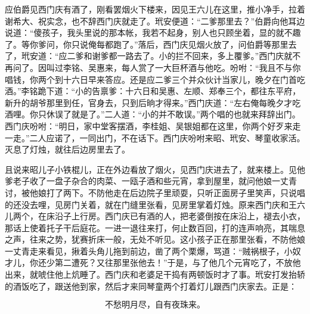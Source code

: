 应伯爵见西门庆有酒了，刚看罢烟火下楼来，因见王六儿在这里，推小净手，拉着谢希大、祝实念，也不辞西门庆就走了。玳安便道：“二爹那里去？”伯爵向他耳边说道：“傻孩子，我头里说的那本帐，我若不起身，别人也只顾坐着，显的就不趣了。等你爹问，你只说俺每都跑了。”落后，西门庆见烟火放了，问伯爵等那里去了，玳安道：“应二爹和谢爹都一路去了。小的拦不回来，多上覆爹。”西门庆就不再问了。因叫过李铭、吴惠来，每人赏了一大巨杯酒与他吃。吩咐：“我且不与你唱钱，你两个到十六日早来答应。还是应二爹三个并众伙计当家儿，晚夕在门首吃酒。”李铭跪下道：“小的告禀爹：十六日和吴惠、左顺、郑奉三个，都往东平府，新升的胡爷那里到任，官身去，只到后晌才得来。”西门庆道：“左右俺每晚夕才吃酒哩。你只休误了就是了。”二人道：“小的并不敢误。”两个唱的也就来拜辞出门。西门庆吩咐：“明日，家中堂客摆酒，李桂姐、吴银姐都在这里，你两个好歹来走一走。”二人应诺了，一同出门，不在话下。西门庆吩咐来昭、玳安、琴童收家活。灭息了灯烛，就往后边房里去了。

且说来昭儿子小铁棍儿，正在外边看放了烟火，见西门庆进去了，就来楼上。见他爹老子收了一盘子杂合的肉菜、一瓯子酒和些元宵，拿到屋里，就问他娘一丈青讨，被他娘打了两下。不防他走在后边院子里顽耍，只听正面房子里笑声，只说唱的还没去哩，见房门关着，就在门缝里张看，见房里掌着灯烛。原来西门庆和王六儿两个，在床沿子上行房。西门庆已有酒的人，把老婆倒按在床沿上，褪去小衣，那话上使着托子干后庭花。一进一退往来打，何止数百回，打的连声响亮，其喘息之声，往来之势，犹赛折床一般，无处不听见。这小孩子正在那里张看，不防他娘一丈青走来看见，揪着头角儿拖到前边，凿了两个栗爆，骂道：“贼祸根子，小奴才儿，你还少第二遭死？又往那里张他去！”于是，与了他几个元宵吃了，不放他出来，就唬住他上炕睡了。西门庆和老婆足干捣有两顿饭时才了事。玳安打发抬轿的酒饭吃了，跟送他到家，然后才来同琴童两个打着灯儿跟西门庆家去。正是：

\[
不愁明月尽，自有夜珠来。
\]

